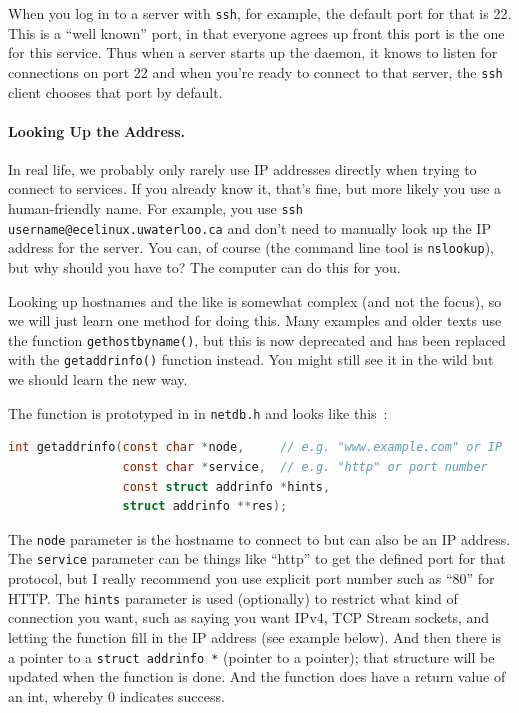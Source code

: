 When you log in to a server with \texttt{ssh}, for example, the default port for that is 22. This is a ``well known'' port, in that everyone agrees up front this port is the one for this service. Thus when a server starts up the daemon, it knows to listen for connections on port 22 and when you're ready to connect to that server, the \texttt{ssh} client chooses that port by default.

\paragraph{Looking Up the Address.}
In real life, we probably only rarely use IP addresses directly when trying to connect to services. If you already know it, that's fine, but more likely you use a human-friendly name. For example, you use \texttt{ssh username@ecelinux.uwaterloo.ca} and don't need to manually look up the IP address for the server. You can, of course (the command line tool is \texttt{nslookup}), but why should you have to? The computer can do this for you.

Looking up hostnames and the like is somewhat complex (and not the focus), so we will just learn one method for doing this. Many examples and older texts use the function \texttt{gethostbyname()}, but this is now deprecated and has been replaced with the \texttt{getaddrinfo()} function instead. You might still see it in the wild but we should learn the new way.

The function is prototyped in in \texttt{netdb.h} and looks like this~\cite{getaddrinfo}:
\begin{lstlisting}[language=C]
int getaddrinfo(const char *node,     // e.g. "www.example.com" or IP
                const char *service,  // e.g. "http" or port number
                const struct addrinfo *hints,
                struct addrinfo **res);
\end{lstlisting}

The \texttt{node} parameter is the hostname to connect to but can also be an IP address. The \texttt{service} parameter can be things like ``http'' to get the defined port for that protocol, but I really recommend you use explicit port number such as ``80'' for HTTP. The \texttt{hints} parameter is used (optionally) to restrict what kind of connection you want, such as saying you want IPv4, TCP Stream sockets, and letting the function fill in the IP address (see example below). And then there is a pointer to a \texttt{struct addrinfo *} (pointer to a pointer); that structure will be updated when the function is done. And the function does have a return value of an int, whereby 0 indicates success. 

